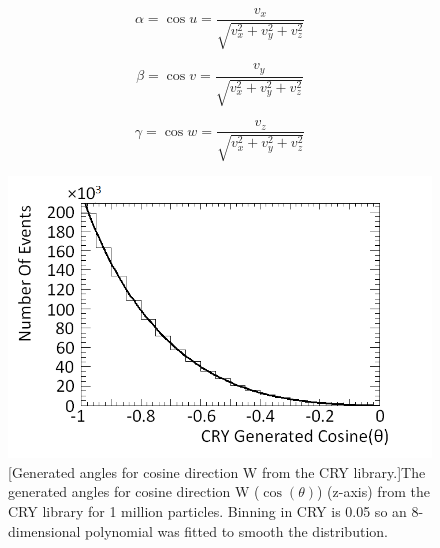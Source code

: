 \begin{equation}
\alpha = \cos{u} = \frac{v_x}{\sqrt{v_x^2+v_y^2+v_z^2}}
\label{equ:cos_u}
\end{equation}

\begin{equation}
\beta = \cos{v} = \frac{v_y}{\sqrt{v_x^2+v_y^2+v_z^2}}
\label{equ:cos_v}
\end{equation}

\begin{equation}
\gamma = \cos{w} = \frac{v_z}{\sqrt{v_x^2+v_y^2+v_z^2}}
\label{equ:cos_w}
\end{equation}

\begin{figure}[!h]
 \centering
 \includegraphics[width=0.5\linewidth]{Chapter4/Figs/CryFitCosWMedText.png}
 [Generated angles for cosine direction W from the CRY library.]{The generated angles for cosine direction W ($\cos(\theta)$) (z-axis) from the CRY library \cite{ieee_cry_2007} for 1 million particles. Binning in CRY is 0.05 so an 8-dimensional polynomial was fitted to smooth the distribution.}
 \label{fig:Cry_GeneratedFit}
\end{figure}

